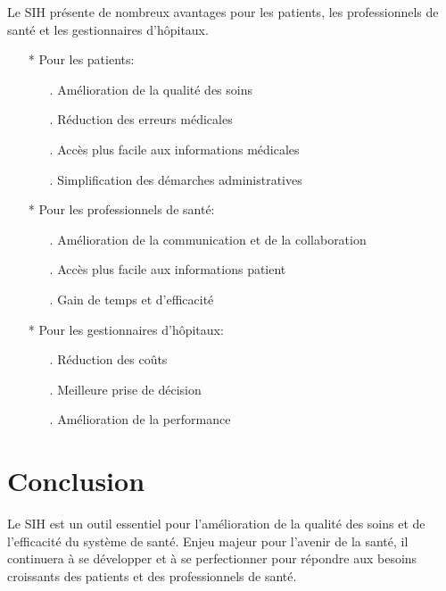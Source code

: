 \documentclass[12pt]{rapportINPTCLOUD}
\begin{document}
	Le SIH présente de nombreux avantages pour les patients, les professionnels de santé et les gestionnaires d'hôpitaux.
	
	\begin{itemize}
		
		\item[*]  Pour les patients:
		
		\begin{itemize}
			\item[.] 		Amélioration de la qualité des soins
			\item[.] 		Réduction des erreurs médicales
			\item[.] 		Accès plus facile aux informations médicales
			\item[.] 		Simplification des démarches administratives
		\end{itemize}
		
		\item[*] Pour les professionnels de santé:
		
		\begin{itemize}
			\item[.] 		Amélioration de la communication et de la collaboration
			\item[.] 		Accès plus facile aux informations patient
			\item[.] 		Gain de temps et d'efficacité
		\end{itemize}
		
		\item[*] Pour les gestionnaires d'hôpitaux:
		
		\begin{itemize}
			\item[.] 		Réduction des coûts
			\item[.] 		Meilleure prise de décision
			\item[.] 		Amélioration de la performance
		\end{itemize}
		
	\end{itemize}
	
	\section{Conclusion}
	
	Le SIH est un outil essentiel pour l'amélioration de la qualité des soins et de l'efficacité du système de santé. Enjeu majeur pour l'avenir de la santé, il continuera à se développer et à se perfectionner pour répondre aux besoins croissants des patients et des professionnels de santé.
\end{document}
